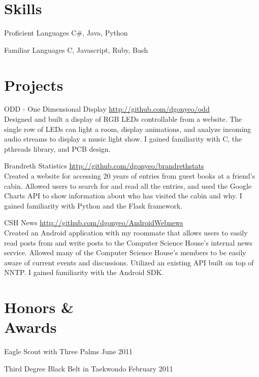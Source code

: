 \documentclass[letterpaper,margin,line,11pt]{resume}
\newcommand{\rurl}[1]{\hfill {\footnotesize \url{#1}}}
\begin{document}
\begin{resume}
\section{\mysidestyle Skills}
	\begin{compactdesc}
		\item[Proficient Languages] C\#, Java, Python
		\item[Familiar Languages] C, Javascript, Ruby, Bash
	\end{compactdesc}

\section{\mysidestyle Projects}
	\begin{compactdesc}
		\item[ODD - One Dimensional Display] \rurl{http://github.com/dgonyeo/odd} \\
			Designed and built a display of RGB LEDs controllable from a website. The single row of LEDs can light a room, display animations, and analyze incoming audio streams to display a music light show. I gained familiarity with C, the pthreads library, and PCB design.
		\item[Brandreth Statistics] \rurl{http://github.com/dgonyeo/brandrethstats} \\
			Created a website for accessing 20 years of entries from guest books at a friend's cabin. Allowed users to search for and read all the entries, and used the Google Charts API to show information about who has visited the cabin and why. I gained familiarity with Python and the Flask framework.
		\item[CSH News] \rurl{http://github.com/dgonyeo/AndroidWebnews} \\
			Created an Android application with my roommate that allows users to easily read posts from and write posts to the Computer Science House's internal news service. Allowed many of the Computer Science House's members to be easily aware of current events and discussions. Utilized an existing API built on top of NNTP. I gained familiarity with the Android SDK.
	\end{compactdesc}

\section{\mysidestyle Honors \& \\ Awards}
	\begin{asparablank}
		\item Eagle Scout with Three Palms \hfill June 2011
		\item Third Degree Black Belt in Taekwondo \hfill February 2011
	\end{asparablank}


\end{resume}
\end{document}
